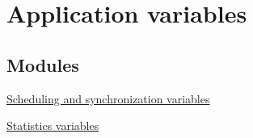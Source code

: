 \hypertarget{group__glossy-test-variables}{
\section{Application variables}
\label{group__glossy-test-variables}
}
\subsection*{Modules}
\begin{DoxyCompactItemize}
\item 
\hyperlink{group__glossy-test-variables-sched-sync}{Scheduling and synchronization variables}
\item 
\hyperlink{group__glossy-test-variables-stats}{Statistics variables}
\end{DoxyCompactItemize}
